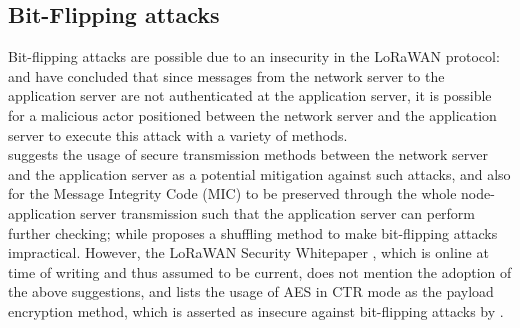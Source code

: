 \documentclass{article}
\begin{document}
\subsection{Bit-Flipping attacks}
Bit-flipping attacks are possible due to an insecurity in the LoRaWAN protocol: \cite{yang.2017} and \cite{7899554} have concluded that since messages from the network server to the application server are not authenticated at the application server, it is possible for a malicious actor positioned between the network server and the application server to execute this attack with a variety of methods.\\
\cite{yang.2017} suggests the usage of secure transmission methods between the network server and the application server as a potential mitigation against such attacks, and also for the Message Integrity Code (MIC) to be preserved through the whole node-application server transmission such that the application server can perform further checking; while \cite{7899554} proposes a shuffling method to make bit-flipping attacks impractical. However, the LoRaWAN Security Whitepaper \cite{lorawan_security_whitepaper}, which is online at time of writing and thus assumed to be current, does not mention the adoption of the above suggestions, and lists the usage of AES in CTR mode as the payload encryption method, which is asserted as insecure against bit-flipping attacks by \cite{ref1}.
\end{document}
